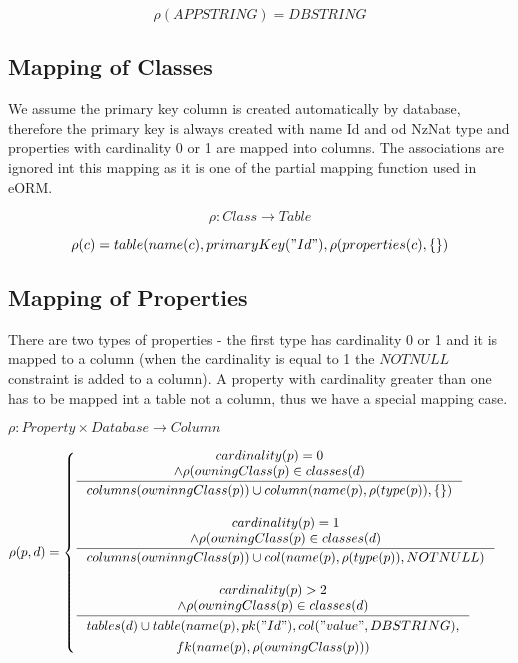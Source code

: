 \documentclass[11pt]{article}
\begin{document}
$$
\rho(APPSTRING) = DBSTRING
$$


\subsection{Mapping of Classes}
We assume the primary key column is created automatically by database, therefore the primary key is always created with name Id and od NzNat type and properties with cardinality 0 or 1 are mapped into columns. The associations are ignored int this mapping as it is one of the partial mapping function used in eORM.

$$
\rho : Class \rightarrow Table
$$

$$
\rho(c) = table(name(c), primaryKey("Id"), \rho(properties(c), \{ \})
$$

\subsection{Mapping of Properties}
There are two types of properties - the first type has cardinality 0 or 1 and it is mapped to a column (when the cardinality is equal to 1 the $NOTNULL$ constraint is added to a column). A property with cardinality greater than one has to be mapped int a table not a column, thus we have a special mapping case.



$
\rho : Property \times Database \rightarrow Column 
$

$\rho(p, d) = \begin{cases}
 \inference{cardinality(p) = 0 \\ \wedge \rho(owningClass(p) \in classes(d)}{columns(owninngClass(p)) \cup column(name(p), \rho(type(p)), \{ \})} \\ \\
 
 \inference{cardinality(p) = 1 \\ \wedge \rho(owningClass(p) \in classes(d)}{columns(owninngClass(p)) \cup col(name(p), \rho(type(p)), NOTNULL)} \\ \\
 
 \inference{cardinality(p) > 2 \\ \wedge \rho(owningClass(p) \in classes(d)}{\begin{gathered} tables(d) \cup table(name(p), pk("Id"), col("value", DBSTRING), \\ fk(name(p), \rho(owningClass(p))) \end{gathered}}
 \end{cases}$
\end{document}
